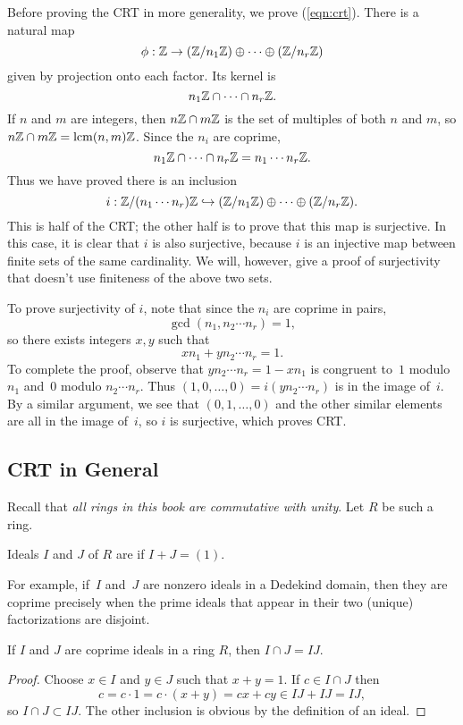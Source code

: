 Before proving the CRT in more generality, we prove
(\ref{eqn:crt}).
There is a natural map 
$$
  \phi: \mathbb{Z} \to (\mathbb{Z}/n_1\mathbb{Z})\oplus \cdots \oplus (\mathbb{Z}/n_r\mathbb{Z})
$$
given by projection onto each factor.  Its kernel is
$$
 n_1 \mathbb{Z} \cap \cdots \cap n_r \mathbb{Z}.
$$ 
If $n$ and $m$ are integers, then $n\mathbb{Z}\cap m\mathbb{Z}$ is the
set of multiples of both $n$ and $m$, so $n\mathbb{Z}\cap m\mathbb{Z} = \operatorname{lcm}(n,m)\mathbb{Z}$.
Since the $n_i$ are coprime, 
$$
 n_1 \mathbb{Z} \cap \cdots \cap n_r \mathbb{Z} = n_1 \cdots n_r \mathbb{Z}.
$$ 
Thus we have proved there is an inclusion 
\begin{equation}\label{eqn:crt_inj}
 i: \mathbb{Z}/(n_1\cdots n_r)\mathbb{Z} \hookrightarrow (\mathbb{Z}/n_1\mathbb{Z})\oplus \cdots \oplus (\mathbb{Z}/n_r\mathbb{Z}).
\end{equation}
This is half of the CRT; the other half is to prove that this map is
surjective.  In this case, it is clear that $i$ is also surjective,
because $i$ is an injective map between finite sets of the same cardinality.
We will, however, give a proof of surjectivity that doesn't use
finiteness of the above two sets.

To prove surjectivity of $i$, note that since the $n_i$ are coprime in
pairs, $$\gcd(n_1, n_2\cdots n_r)=1,$$ so there exists integers $x,y$
such that
$$
   x n_1 + y n_2\cdots n_r = 1.
$$
To complete the proof, observe that 
$ y n_2\cdots n_r = 1 - x n_1$
is congruent to~$1$ modulo $n_1$ and~$0$ modulo $n_2\cdots n_r$.
Thus $(1,0,\ldots,0) = i (y n_2\cdots n_r)$ is in the image of~$i$.  
By a similar argument, we see that $(0,1,\ldots,0)$ and the
other similar elements are all in the image of~$i$, so $i$
is surjective, which proves CRT.  

\subsection{CRT in General}
Recall that {\em all rings in this book are commutative with unity}.
Let $R$ be such a ring.
\begin{definition}[Coprime]
Ideals $I$ and $J$ of $R$ are  if $I+J=(1)$.
\end{definition}
For example, if~$I$ and~$J$ are nonzero ideals in a Dedekind domain,
then they are coprime precisely when the prime ideals that appear in
their two (unique) factorizations are disjoint.

\begin{lemma}\label{lem:prodint}
If $I$ and $J$ are coprime ideals in a ring $R$, then
$I\cap{}J = IJ$.
\end{lemma}
\begin{proof}
Choose $x\in I$ and $y\in J$
such that $x+y=1$.  If $c\in{} I\cap{} J$ then 
$$c=c\cdot 1=c\cdot (x+y) = cx + cy \in IJ + IJ = IJ,$$
so $I\cap{} J\subset IJ$.  
The other inclusion is obvious by the definition of an ideal.
\end{proof}

